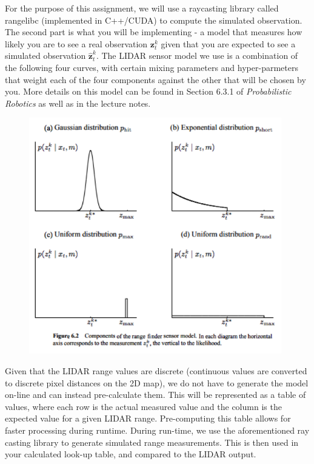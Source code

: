 \documentclass[final]{article}
\begin{document}
For the purpose of this assignment, we will use a raycasting library called rangelibc (implemented in C++/CUDA) to compute the simulated observation. The second part is what you will be implementing - a model that measures how likely you are to see a real observation $\mathbf{z}^k_t$ given that you are expected to see a simulated observation $\hat{\mathbf{z}}^k_t$. The LIDAR sensor model we use is a combination of the following four curves, with certain mixing parameters and hyper-parmeters that weight each of the four components against the other that will be chosen by you. More details on this model can be found in Section 6.3.1 of \textit{Probabilistic Robotics} as well as in the lecture notes.

\begin{figure}[h]
\centering
\includegraphics[width=11cm]{figs/s_noise.png}
\end{figure}

Given that the LIDAR range values are discrete (continuous values are converted to discrete pixel distances on the 2D map), we do not have to generate the model on-line and can instead pre-calculate them. This will be represented as a table of values, where each row is the actual measured value and the column is the expected value for a given LIDAR range. Pre-computing this table allows for faster processing during runtime. During run-time, we use the aforementioned ray casting library to generate simulated range measurements. This is then used in your calculated look-up table, and compared to the LIDAR output.
\end{document}
